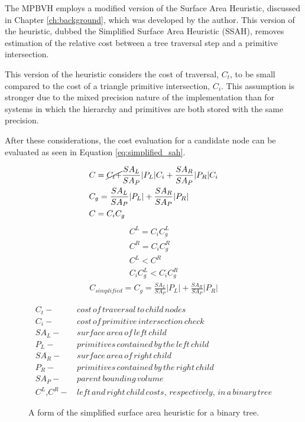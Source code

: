The MPBVH employs a modified version of the Surface Area Heuristic,
discussed in Chapter \ref{ch:background}, which was developed by the
author. This version of the heuristic, dubbed the Simplified Surface Area
Heuristic (SSAH), removes estimation of the relative cost between a tree
traversal step and a primitive intersection.

This version of the heuristic considers the cost of traversal, $C_{t}$, to be
small compared to the cost of a triangle primitive intersection, $C_{i}$. This
assumption is stronger due to the mixed precision nature of the implementation
than for systems in which the hierarchy and primitives are both stored with the
same precision.

After these considerations, the cost evaluation for a candidate node can be
evaluated as seen in Equation \ref{eq:simplified_sah}.

\begin{figure}[H]
  \begin{align}
&C =  \cancel{C_{t} +} \frac{SA_{L}}{SA_{P}} |P_{L}|C_{i} + \frac{SA_{R}}{SA_{P}} |P_{R}|C_{i} \\
&C_{g} = \frac{SA_{L}}{SA_{P}} |P_{L}| +  \frac{SA_{R}}{SA_{P}}|P_{R}| \\
&C = C_{i}C_{g}
  \end{align}
  \begin{align*}
    C^{L} = C_{i} C^{L}_{g} \\
    C^{R} = C_{i} C^{R}_{g} \\
    C^{L} < C^{R} \\
    C_{i}C^{L}_{g} < C_{i}C^{R}_{g}
  \end{align*}
  \begin{align}
    C_{simplified} = C_{g} = \frac{SA_{L}}{SA_{P}} |P_{L}| +
    \frac{SA_{R}}{SA_{P}}|P_{R}|
    \label{eq:simplified_sah}
  \end{align}

  \begin{align*}
    C_{t} - & \,cost\, of\, traversal\, to\, child\, nodes \\
    C_{i} - & \, cost\, of\, primitive\, intersection\, check\, \\
    SA_{L} - &  \,surface\, area\, of\, left\, child \\
    P_{L} - & \, primitives\, contained\, by\, the\, left\, child  \\
    SA_{R} - & \, surface\, area\, of\, right\, child \\
    P_{R} - & \, primitives\, contained\, by\, the\, right\, child \\
    SA_{P} - & \, parent\, bounding\, volume \\
    C^{L} \text{,} C^{R} - & \, left \, and \, right \, child \, costs, \, respectively, \, in \, a \, binary \, tree
  \end{align*}
  
  \caption{A form of the simplified surface area heuristic for a binary tree.}
  \label{fig:SSAH}
\end{figure}

